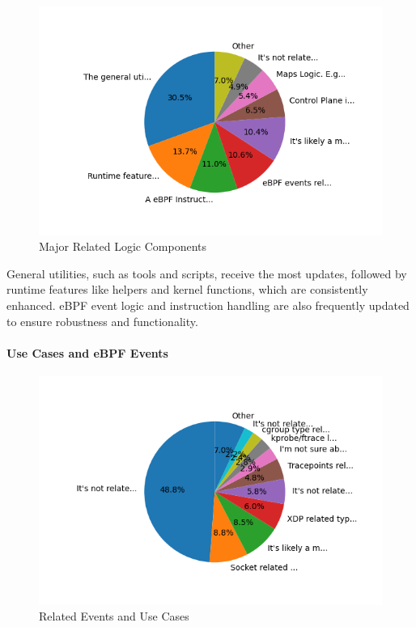 \begin{figure}[ht]
    \centering
    \includegraphics[width=\linewidth]{feature-analysis/commit_pie_chart_major_logic_component.png}
    \caption{Major Related Logic Components}
    \label{fig:commit_pie_chart_major_logic_component}
\end{figure}

General utilities, such as tools and scripts, receive the most updates, followed by runtime features like helpers and kernel functions, which are consistently enhanced. eBPF event logic and instruction handling are also frequently updated to ensure robustness and functionality.

\paragraph{Use Cases and eBPF Events}

\begin{figure}[ht]
    \centering
    \includegraphics[width=\linewidth]{feature-analysis/commit_pie_chart_usecases_or_submodule_events.png}
    \caption{Related Events and Use Cases}
    \label{fig:commit_pie_chart_usecases_or_submodule_events}
\end{figure}

